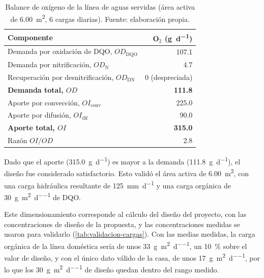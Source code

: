 \begin{table}[htbp]
  \centering
  \caption{Balance de oxígeno de la línea de aguas servidas (área activa de \qty{6.00}{\square\meter}, 6 cargas diarias). Fuente: elaboración propia.}
  \label{tab:balance-oxigeno}
  \begin{tabular}{@{}lr@{}}
    \toprule
    Componente & O$_2$ (\unit{\gram\per\day}) \\
    \midrule
    Demanda por oxidación de DQO, $OD_{\mathrm{DQO}}$ & \num{107.1} \\
    Demanda por nitrificación, $OD_{\mathrm{N}}$ & \num{4.7} \\
    Recuperación por desnitrificación, $OD_{\mathrm{DN}}$ & 0 (despreciada) \\
    \textbf{Demanda total, $OD$} & \textbf{\num{111.8}} \\
    \midrule
    Aporte por convección, $OI_{\mathrm{conv}}$ & \num{225.0} \\
    Aporte por difusión, $OI_{\mathrm{dif}}$ & \num{90.0} \\
    \textbf{Aporte total, $OI$} & \textbf{\num{315.0}} \\
    \midrule
    Razón $OI/OD$ & \num{2.8} \\
    \bottomrule
  \end{tabular}
\end{table}

Dado que el aporte (\qty{315.0}{\gram\per\day}) es mayor a la demanda (\qty{111.8}{\gram\per\day}), el diseño fue considerado satisfactorio.
Esto validó el área activa de \qty{6.00}{\square\meter}, con una carga hidráulica resultante de \qty{125}{\milli\meter\per\day} y una carga orgánica de \qty{30}{\gram\per\square\meter\per\day} de DQO.

Este dimensionamiento corresponde al cálculo del diseño del proyecto, con las concentraciones de diseño de la propuesta, y las concentraciones medidas se usaron para validarlo (\cref{tab:validacion-cargas}).
Con las medias medidas, la carga orgánica de la línea doméstica sería de unos \qty{33}{\gram\per\square\meter\per\day}, un \qty{10}{\percent} sobre el valor de diseño, y con el único dato válido de la casa, de unos \qty{17}{\gram\per\square\meter\per\day}, por lo que los \qty{30}{\gram\per\square\meter\per\day} de diseño quedan dentro del rango medido.

